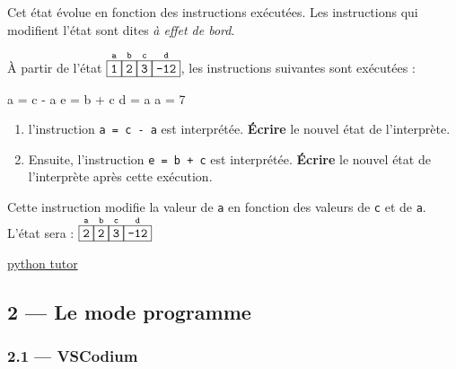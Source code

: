 \documentclass[a4paper,17pt]{extarticle}
\providecommand{\tightlist}{%
      \setlength{\itemsep}{0pt}\setlength{\parskip}{0pt}}
\newenvironment{Shaded}{}{}
\newcommand{\DecValTok}[1]{\textcolor[rgb]{0.25,0.63,0.44}{{#1}}}
\newcommand{\NormalTok}[1]{{#1}}
\newcommand{\OperatorTok}[1]{\textcolor[rgb]{0.40,0.40,0.40}{{#1}}}
\begin{document}
Cet état évolue en fonction des instructions exécutées. Les instructions
qui modifient l'état sont dites \emph{à effet de bord}.

    À partir de l'état
\(\overset{\texttt{a}}{\fbox{\texttt{1}}}\overset{\texttt{b}}{\fbox{\texttt{2}}}\overset{\texttt{c}}{\fbox{\texttt{3}}}\overset{\texttt{d}}{\fbox{\texttt{-12}}}\),
les instructions suivantes sont exécutées :

\begin{Shaded}
\begin{Highlighting}[]
\NormalTok{a }\OperatorTok{=}\NormalTok{ c }\OperatorTok{{-}}\NormalTok{ a}
\NormalTok{e }\OperatorTok{=}\NormalTok{ b }\OperatorTok{+}\NormalTok{ c}
\NormalTok{d }\OperatorTok{=}\NormalTok{ a}
\NormalTok{a }\OperatorTok{=} \DecValTok{7}
\end{Highlighting}
\end{Shaded}

\begin{enumerate}
\def\labelenumi{\arabic{enumi}.}
\tightlist
\item
  l'instruction \texttt{a\ =\ c\ -\ a} est interprétée. \textbf{Écrire}
  le nouvel état de l'interprète.
\item
  Ensuite, l'instruction \texttt{e\ =\ b\ +\ c} est interprétée.
  \textbf{Écrire} le nouvel état de l'interprète après cette exécution.
\end{enumerate}

    Cette instruction modifie la valeur de \texttt{a} en fonction des
valeurs de \texttt{c} et de \texttt{a}. L'état sera :
\(\overset{\texttt{a}}{\fbox{\texttt{2}}}\overset{\texttt{b}}{\fbox{\texttt{2}}}\overset{\texttt{c}}{\fbox{\texttt{3}}}\overset{\texttt{d}}{\fbox{\texttt{-12}}}\)

    \href{https://pythontutor.com/visualize.html\#code=a\%20\%3D\%201\%0Ab\%20\%3D\%202\%0Ac\%20\%3D\%203\%0Ad\%20\%3D\%20-12\%0A\%0Aa\%20\%3D\%20c\%20-\%20a\%0Ae\%20\%3D\%20b\%20\%2B\%20c\%0A\%0Ad\%20\%3D\%20a\%0Aa\%20\%3D\%207\&cumulative=true\&curInstr=0\&heapPrimitives=true\&mode=display\&origin=opt-frontend.js\&py=3\&rawInputLstJSON=\%5B\%5D\&textReferences=false}{python
tutor}

    \hypertarget{le-mode-programme}{%
\subsection{2 --- Le mode programme}\label{le-mode-programme}}

    \hypertarget{vscodium}{%
\subsubsection{2.1 --- VSCodium}\label{vscodium}}
\end{document}
